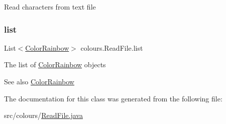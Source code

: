 Read characters from text file \mbox{\label{classcolours_1_1_read_file_ada4823ab03166bb5b0c388b40460fa7d}} 
\subsubsection{\texorpdfstring{list}{list}}
{\footnotesize\ttfamily List$<$\hyperlink{classcolours_1_1_color_rainbow}{Color\+Rainbow}$>$ colours.\+Read\+File.\+list\hspace{0.3cm}{\ttfamily [private]}}

The list of \hyperlink{classcolours_1_1_color_rainbow}{Color\+Rainbow} objects \begin{DoxySeeAlso}{See also}
\hyperlink{classcolours_1_1_color_rainbow}{Color\+Rainbow} 
\end{DoxySeeAlso}


The documentation for this class was generated from the following file\+:\begin{DoxyCompactItemize}
\item 
src/colours/\hyperlink{_read_file_8java}{Read\+File.\+java}\end{DoxyCompactItemize}
